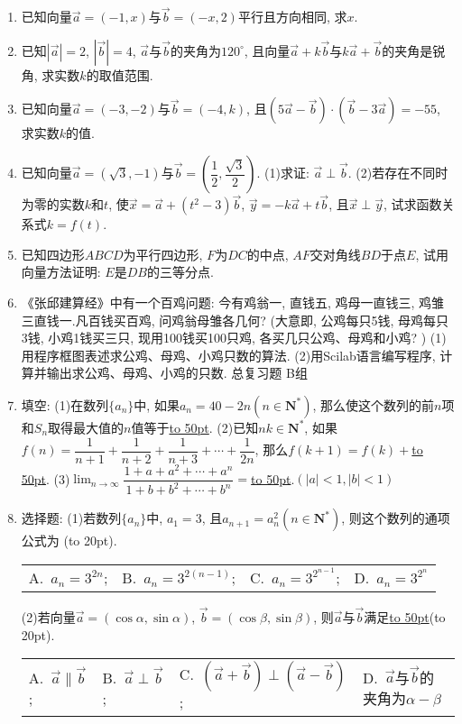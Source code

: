 \documentclass[10pt,a4paper]{article}
\newcommand{\blank}[1]{\underline{\hbox to #1pt{}}}
\newcommand{\bracket}[1]{(\hbox to #1pt{})}
\newcommand{\fourch}[4]{\par\begin{tabular}{p{.23\textwidth}p{.23\textwidth}p{.23\textwidth}p{.23\textwidth}}
A.~#1 &B.~#2& C.~#3& D.~#4
\end{tabular}}
\begin{document}
\begin{enumerate}[1.]
\item 已知向量$\overrightarrow a=(-1,x)$与$\overrightarrow b=(-x,2)$平行且方向相同, 求$x$.
\item 已知$|\overrightarrow a|=2$, $|\overrightarrow b|=4$, $\overrightarrow a$与$\overrightarrow b$的夹角为$120^{\circ }$, 且向量$\overrightarrow a+k\overrightarrow b$与$k\overrightarrow a+\overrightarrow b$的夹角是锐角, 求实数$k$的取值范围.
\item 已知向量$\overrightarrow a=(-3,-2)$与$\overrightarrow b=(-4,k)$, 且$(5\overrightarrow a-\overrightarrow b)\cdot (\overrightarrow b-3\overrightarrow a)=-55$, 求实数$k$的值.
\item 已知向量$\overrightarrow a=(\sqrt 3,-1)$与$\overrightarrow b=(\dfrac 12,\dfrac{\sqrt 3}2)$.
(1)求证: $\overrightarrow a\perp \overrightarrow b$.
(2)若存在不同时为零的实数$k$和$t$, 使$\overrightarrow x=\overrightarrow a+(t^2-3)\overrightarrow b$, $\overrightarrow y=-k\overrightarrow a+t\overrightarrow b$, 且$\overrightarrow x\perp \overrightarrow y$, 试求函数关系式$k=f(t)$.
\item 已知四边形$ABCD$为平行四边形, $F$为$DC$的中点, $AF$交对角线$BD$于点$E$, 试用向量方法证明: $E$是$DB$的三等分点.
\item 《张邱建算经》中有一个百鸡问题: 今有鸡翁一, 直钱五, 鸡母一直钱三, 鸡雏三直钱一.凡百钱买百鸡, 问鸡翁母雏各几何? (大意即, 公鸡每只5钱, 母鸡每只3钱, 小鸡1钱买三只, 现用100钱买100只鸡, 各买几只公鸡、母鸡和小鸡? )
(1)用程序框图表述求公鸡、母鸡、小鸡只数的算法.
(2)用Scilab语言编写程序, 计算并输出求公鸡、母鸡、小鸡的只数.
总复习题
B组
\item 填空:
(1)在数列$\{a_n\}$中, 如果$a_n=40-2n(n\in \mathbf{N}^*)$, 那么使这个数列的前$n$项和$S_n$取得最大值的$n$值等于\blank{50}.
(2)已知$nk\in \mathbf{N}^*$, 如果$f(n)=\dfrac 1{n+1}+\dfrac 1{n+2}+\dfrac 1{n+3}+\cdots +\dfrac 1{2n}$, 那么$f(k+1)=f(k)+$\blank{50}.
(3)$\displaystyle\lim_{n\to\infty}\dfrac{1+a+{a^2}+\cdots +{a^n}}{1+b+{b^2}+\cdots +{b^n}}=$\blank{50}.$(|a|<1,|b|<1)$
\item 选择题:
(1)若数列$\{a_n\}$中, $a_1=3$, 且$a_{n+1}=a_n^2(n\in \mathbf{N}^*)$, 则这个数列的通项公式为    \bracket{20}.
\fourch{$a_n=3^{2n}$;}{$a_n=3^{2(n-1)}$;}{$a_n=3^{2^{n-1}}$;}{$a_n=3^{2^n}$}
(2)若向量$\overrightarrow a=(\cos \alpha ,\sin \alpha)$, $\overrightarrow b=(\cos \beta ,\sin \beta)$, 则$\overrightarrow a$与$\overrightarrow b$满足\blank{50}\bracket{20}.
\fourch{$\overrightarrow a\parallel \overrightarrow b$;}{$\overrightarrow a\perp \overrightarrow b$;}{$(\overrightarrow a+\overrightarrow b)\perp (\overrightarrow a-\overrightarrow b)$;}{$\overrightarrow a$与$\overrightarrow b$的夹角为$\alpha -\beta$}

\end{enumerate}
\end{document}

